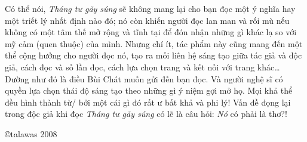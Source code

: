 \documentclass[../main.tex]{subfiles}
\begin{document}
\begin{multicols}{2}
 
Có thể nói, \textit{Tháng tư gãy súng} sẽ không mang lại cho bạn đọc một ý nghĩa hay một triết lý nhất định nào đó; nó còn khiến người đọc lan man và rối mù nếu không có một tâm thế mở rộng và tĩnh tại để đón nhận những gì khác lạ so với mỹ cảm (quen thuộc) của mình. Nhưng chí ít, tác phẩm này cũng mang đến một thể cộng hưởng cho người đọc nó, tạo ra mối liên hệ sáng tạo giữa tác giả và độc giả, cách đọc và số lần đọc, cách lựa chọn trang và kết nối với trang khác… Dường như đó là điều Bùi Chát muốn gửi đến bạn đọc. Và người nghệ sĩ có quyền lựa chọn thái độ sáng tạo theo những gì ý niệm gợi mở họ. Mọi khả thể đều hình thành từ/ bởi một cái gì đó rất ư bất khả và phi lý! Vấn đề đọng lại trong độc giả khi đọc \textit{Tháng tư gãy súng} có lẽ là câu hỏi: \textit{Nó} có phải là thơ?! 
 
©talawas 2008  




\end{multicols}
\end{document}
